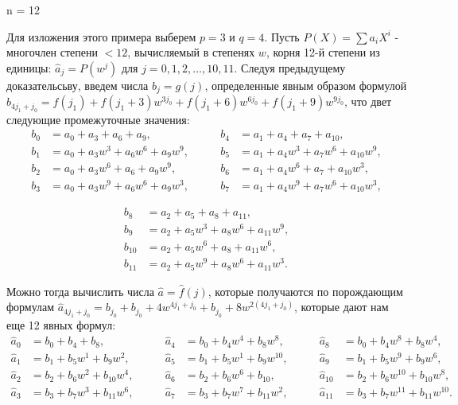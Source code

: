 \documentclass{mai_book}
\begin{document}
	\bigskip\bigskip
	
	 n = 12
	
	\medskip
	
	Для изложения этого примера выберем $p =3$ и $q = 4$. Пусть $P(X) = \sum a_iX^i$ - многочлен степени $< 12$, вычисляемый в степенях $w$, корня 12-й степени из единицы: $\hat a_j = P(w^j)$ для $j = 0, 1,2,\ldots,10,11$. Следуя предыдущему доказательсьву, введем числа $b_j=g(j)$, определенные явным образом формулой $b_{4j_1+j_0}=f(j_1)+f(j_1+3)w^{3j_0}+f(j_1+6)w^{6j_0}+f(j_1+9)w^{9j_0}$, что двет следующие промежуточные значения:
	\begin{align*}
		b_0 &= a_0 + a_3 + a_6 + a_9, &\qquad b_4 &= a_1 + a_4 + a_7 + a_{10},\\
		b_1 &= a_0 + a_3w^3 + a_6w^6 + a_9w^9, &\qquad b_5 &= a_1 + a_4w^3 + a_7w^6 + a_{10}w^9,\\
		b_2 &= a_0 + a_3w^6 + a_6 + a_9w^9, &\qquad b_6 &= a_1 + a_4w^6 + a_7 + a_{10}w^3,\\
		b_3 &= a_0 + a_3w^9 + a_6w^6 + a_9w^3, &\qquad b_7 &= a_1 + a_4w^9 + a_7w^6 + a_{10}w^3,
	\end{align*}

	\newpage
	
	
	\begin{align*}
	b_8 &= a_2 + a_5 + a_8 + a_{11},\\
	b_9 &= a_2 + a_5w^3 + a_8w^6 + a_{11}w^9,\\
	b_{10} &= a_2 + a_5w^6 + a_8 + a_{11}w^6,\\
	b_{11} &= a_2 + a_5w^9 + a_8w^6 + a_{11}w^3.
	\end{align*}
	
	\noindent Можно тогда вычислить числа $\hat a = \hat f(j)$, которые получаются по порождающим формулам $\hat a_{4j_1+j_0} = b_{j_0} + b_{j_0} + 4w^{4j_1+j_0}+b_{j_0}+8w^{2(4j_1+j_0)}$, которые дают нам еще 12 явных формул:
	\begin{align*}
	\hat a_0 &= b_0+b_4+b_8, &\qquad \hat a_4 &= b_0 + b_4w^4 + b_8w^8, &\qquad \hat a_8 &= b_0 + b_4w^8 + b_8w^4,\\
	\hat a_1 &= b_1+b_5w^1+b_9w^2, &\qquad \hat a_5 &= b_1 + b_5w^1 + b_9w^{10}, &\qquad \hat a_9 &= b_1 + b_5w^9 + b_9w^6,\\
	\hat a_2 &= b_2 + b_6w^2 + b_{10}w^4, &\qquad \hat a_6 &= b_2 + b_6w^6 + b_{10}, &\qquad \hat a_{10} &= b_2 + b_6w^{10} + b_{10}w^8,\\
	\hat a_3 &= b_3 + b_7w^3 + b_{11}w^6, &\qquad \hat a_7 &= b_3 + b_7w^7 + b_{11}w^2, &\qquad \hat a_{11} &= b_3+b_7w^{11}+b_{11}w^{10}.
	\end{align*}
	
\end{document}
